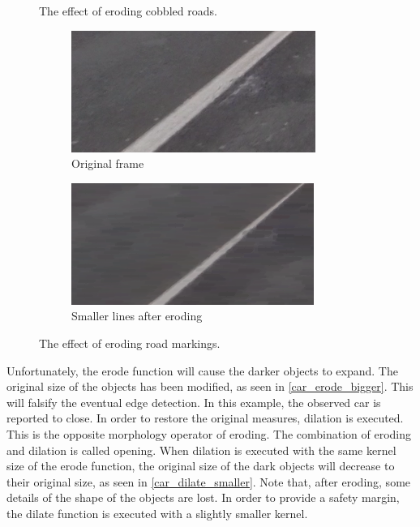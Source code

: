 \documentclass[runningheads,a4paper]{llncs}
\begin{document}
\begin{figure}[ht]
\begin{minipage}[t]{.45\textwidth}
		\caption{The effect of eroding cobbled roads.}
	\end{minipage}%
	\hspace{0.05\textwidth}
	\begin{minipage}[t]{.45\textwidth}
		\centering
		\begin{subfigure}[t]{.5\textwidth}
		  \centering
		  \includegraphics[width=.9\textwidth]{fig/line_zoom_original.png}
		  \caption{Original frame\label{line_zoom_original}}
		\end{subfigure}%
		\begin{subfigure}[t]{.5\textwidth}
		  \centering
		  \includegraphics[width=.9\textwidth]{fig/line_zoom_eroded.png}
		  \caption{Smaller lines after eroding\label{line_zoom_eroded}}
		\end{subfigure}
		\caption{The effect of eroding road markings.}
	\end{minipage}
\end{figure}

Unfortunately, the erode function will cause the darker objects to expand. The original size of the objects has been modified, as seen in \ref{car_erode_bigger}. This will falsify the eventual edge detection. In this example, the observed car is reported to close. In order to restore the original measures, dilation is executed. This is the opposite morphology operator of eroding. The combination of eroding and dilation is called opening. When dilation is executed with the same kernel size of the erode function, the original size of the dark objects will decrease to their original size, as seen in \ref{car_dilate_smaller}. Note that, after eroding, some details of the shape of the objects are lost. In order to provide a safety margin, the dilate function is executed with a slightly smaller kernel.
\end{document}
